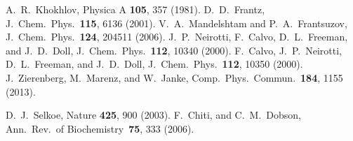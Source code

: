A.~R.\ Khokhlov, Physica A \textbf{105}, 357 (1981).
%
D.~D.\ Frantz, J.~Chem.\ Phys.\ \textbf{115}, 
6136 (2001).
%
V.~A.\ Mandelshtam and P.~A.\ Frantsuzov, J.~Chem.\ Phys.\ \textbf{124}, 
204511 (2006).
%
%
J.~P.\ Neirotti, F.~Calvo, D.~L.\ Freeman, and J.~D.\ Doll, J.~Chem.\ Phys.\ 
\textbf{112}, 10340 (2000).
%
F.~Calvo, J.~P.\ Neirotti, D.~L.\ Freeman, and J.~D.\ Doll, J.~Chem.\ Phys.\ 
\textbf{112}, 10350 (2000).
%
%
%
J.~Zierenberg, M.~Marenz, and W.~Janke, Comp.\ Phys.\ Commun.\
\textbf{184}, 1155 (2013). 
%
%


%
D.~J.\ Selkoe, Nature \textbf{425}, 900 (2003).
%
\bibitem{Chiti} 
F.~Chiti, and C.~M.\ Dobson, Ann.\ Rev.\ of Biochemistry\
\textbf{75}, 333 (2006).  
%




